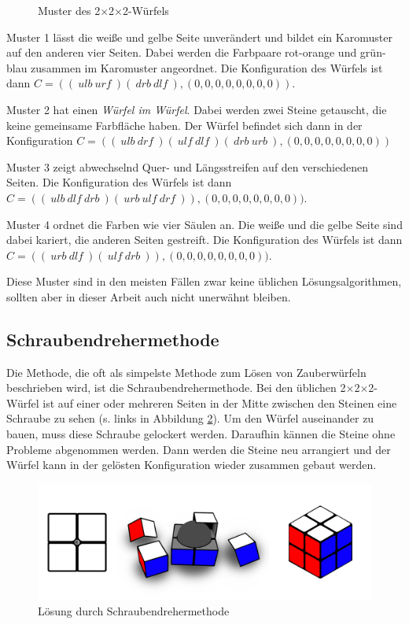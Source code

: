\documentclass[12pt,a4paper, usenames, dvipsnames]{article}
\theoremstyle{mystyle}
\theoremstyle{definition}
\newcommand{\Ttwo}{2$\times$2$\times$2-}
\begin{document}
\begin{figure}[h]
\caption{Muster des \Ttwo Würfels}
\label{Abbildung_Muster}
\end{figure}

Muster 1 lässt die weiße und gelbe Seite unverändert und bildet ein Karomuster auf den anderen vier Seiten. Dabei werden die Farbpaare rot-orange und grün-blau zusammen im  Karomuster angeordnet. Die Konfiguration des Würfels ist dann $C = ((\ \textit{ulb} \ \textit{urf} \ )( \ \textit{drb} \ \textit{dlf} \ ),(0,0,0,0,0,0,0,0))$.

Muster 2 hat einen \textit{Würfel im Würfel}. Dabei werden zwei Steine getauscht, die keine gemeinsame Farbfläche haben. Der Würfel befindet sich dann in der Konfiguration $C = (( \ ulb \ drf \ )( \ ulf \ dlf \ )( \ drb \ urb \ ),(0,0,0,0,0,0,0,0))$

Muster 3 zeigt abwechselnd Quer- und Längsstreifen auf den verschiedenen Seiten. Die Konfiguration des Würfels ist dann $C = (( \ \textit{ulb} \ \textit{dlf} \ \textit{drb} \ )( \ \textit{urb} \ \textit{ulf} \ \textit{drf} \ )),(0,0,0,0,0,0,0,0))$.

Muster 4 ordnet die Farben wie vier Säulen an. Die weiße und die gelbe Seite sind dabei kariert, die anderen Seiten gestreift. Die Konfiguration des Würfels ist dann $C = ( (\ \textit{urb} \ \textit{dlf} \ )( \ \textit{ulf} \ \textit{drb} \ ) ),(0,0,0,0,0,0,0,0))$.


Diese Muster sind in den meisten Fällen zwar keine üblichen Lösungsalgorithmen, sollten aber in dieser Arbeit auch nicht unerwähnt bleiben.

%
%
%
%
%
%
%
%
%
%
%
%
%
%
%
%
%
%
%
\subsection{Schraubendrehermethode}

Die Methode, die oft als simpelste Methode zum Lösen von Zauberwürfeln beschrieben wird, ist die Schraubendrehermethode.
Bei den üblichen \Ttwo Würfel ist auf einer oder mehreren Seiten in der Mitte zwischen den Steinen eine Schraube zu sehen (s. links in Abbildung \ref{Abbildung_Schraubendrehermethode}).
Um den Würfel auseinander zu bauen, muss diese Schraube gelockert werden. Daraufhin kännen die Steine ohne Probleme abgenommen werden. 
Dann werden die Steine neu arrangiert und der Würfel kann in der gelösten Konfiguration wieder zusammen gebaut werden.

\begin{figure}[H]
\centering
\includegraphics[scale=0.2]{schraube_m.png}
\caption{Lösung durch Schraubendrehermethode}
\label{Abbildung_Schraubendrehermethode}
\end{figure}
\end{document}
